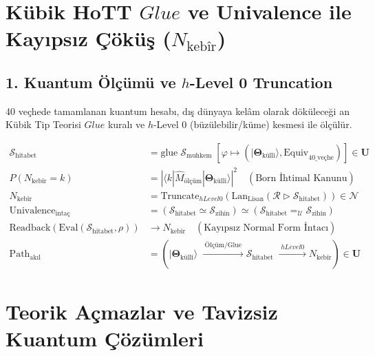 \documentclass[11pt, a4paper]{article}
\begin{document}
\section{Kübik HoTT $Glue$ ve Univalence ile Kayıpsız Çöküş ($N_{\text{kebîr}}$)}

\subsection{1. Kuantum Ölçümü ve $h$-Level 0 Truncation}
40 veçhede tamamlanan kuantum hesabı, dış dünyaya kelâm olarak döküleceği an Kübik Tip Teorisi $Glue$ kuralı ve $h$-Level 0 (büzülebilir/küme) kesmesi ile ölçülür.

\begin{align}
\mathcal{S}_{\text{hitabet}} &= \text{glue} \; \mathcal{S}_{\text{muhkem}} \; \left[ \varphi \mapsto (|\mathbf{\Theta}_{\text{küllî}}\rangle, \text{Equiv}_{\text{40\_veçhe}}) \right] \in \mathbf{U} \\
P(N_{\text{kebîr}} = k) &= \left| \langle k | \hat{M}_{\text{ölçüm}} |\mathbf{\Theta}_{\text{küllî}}\rangle \right|^2 \quad (\text{Born İhtimal Kanunu}) \\
N_{\text{kebîr}} &= \text{Truncate}_{hLevel 0}\left( \text{Lan}_{\text{Lisan}} \left( \mathcal{R} \triangleright \mathcal{S}_{\text{hitabet}} \right) \right) \in \mathcal{N} \\
\text{Univalence}_{\text{intaç}} &= (\mathcal{S}_{\text{hitabet}} \simeq \mathcal{S}_{\text{zihin}}) \simeq (\mathcal{S}_{\text{hitabet}} =_{\mathcal{U}} \mathcal{S}_{\text{zihin}}) \\
\text{Readback}(\text{Eval}(\mathcal{S}_{\text{hitabet}}, \rho)) &\longrightarrow N_{\text{kebîr}} \quad (\text{Kayıpsız Normal Form İntacı}) \\
\text{Path}_{\text{akıl}} &= \left( |\mathbf{\Theta}_{\text{küllî}}\rangle \;\xrightarrow{\;\text{Ölçüm/Glue}\;} \mathcal{S}_{\text{hitabet}} \;\xrightarrow{\;hLevel 0\;} N_{\text{kebîr}} \right) \in \mathbf{U}
\end{align}

\section{Teorik Açmazlar ve Tavizsiz Kuantum Çözümleri}
\end{document}
